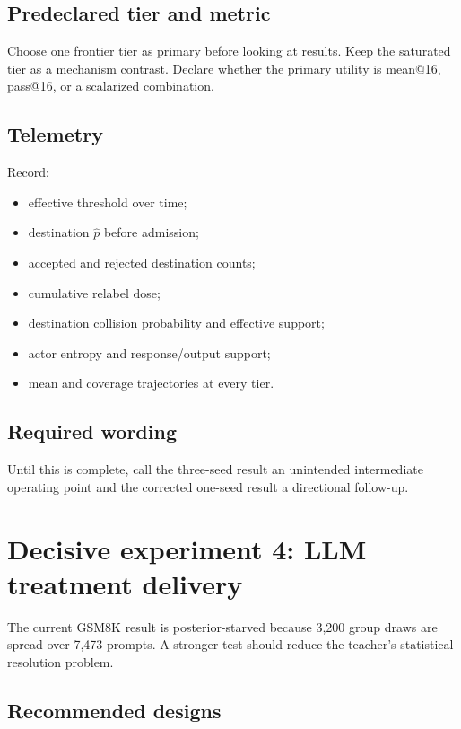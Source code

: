 \documentclass[11pt]{article}
\theoremstyle{definition}
\theoremstyle{remark}
\begin{document}
\subsection{Predeclared tier and metric}

Choose one frontier tier as primary before looking at results. Keep the saturated tier as a mechanism contrast. Declare whether the primary utility is mean@16, pass@16, or a scalarized combination.

\subsection{Telemetry}

Record:

\begin{itemize}[leftmargin=2em]
\item effective threshold over time;
\item destination $\widehat p$ before admission;
\item accepted and rejected destination counts;
\item cumulative relabel dose;
\item destination collision probability and effective support;
\item actor entropy and response/output support;
\item mean and coverage trajectories at every tier.
\end{itemize}

\subsection{Required wording}

Until this is complete, call the three-seed result an unintended intermediate operating point and the corrected one-seed result a directional follow-up.

\section{Decisive experiment 4: LLM treatment delivery}

The current GSM8K result is posterior-starved because 3,200 group draws are spread over 7,473 prompts. A stronger test should reduce the teacher's statistical resolution problem.

\subsection{Recommended designs}
\end{document}
